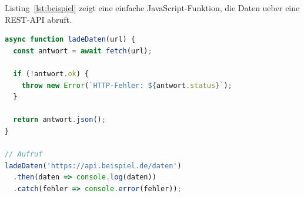 Listing~\ref{lst:beispiel} zeigt eine einfache JavaScript-Funktion, die
Daten ueber eine \ac{REST}-\ac{API} abruft.

\begin{lstlisting}[language=JavaScript, caption={Asynchroner API-Abruf in JavaScript}, label=lst:beispiel]
async function ladeDaten(url) {
  const antwort = await fetch(url);

  if (!antwort.ok) {
    throw new Error(`HTTP-Fehler: ${antwort.status}`);
  }

  return antwort.json();
}

// Aufruf
ladeDaten('https://api.beispiel.de/daten')
  .then(daten => console.log(daten))
  .catch(fehler => console.error(fehler));
\end{lstlisting}
